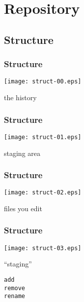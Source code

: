 \documentclass[english]{beamer}
\newcommand{\mysection}[2]{%
  \hypertarget{#2}{}%
  \section{#1}%
  \label{#2}%
}
\newcommand{\mysubsection}[2]{%
  \hypertarget{#2}{}%
  \subsection{#1}%
  \label{#2}%
}
\newcommand{\CMD}[1]{%
\texttt{\textcolor{code-green}{#1}}%
}
\begin{document}
\mysection{Repository}{_repository}
\mysubsection{Structure}{repo:structure}
\begin{frame}
\frametitle{Structure}

\texttt{[image: struct-00.eps]}
\vspace{\baselineskip}
\begin{center}
        the history
\end{center}
\vspace{\textheight}
\end{frame}

\begin{frame}
\frametitle{Structure}

\texttt{[image: struct-01.eps]}
\vspace{\baselineskip}
\begin{center}
        staging area
\end{center}
\vspace{\textheight}
\end{frame}

\begin{frame}
\frametitle{Structure}

\texttt{[image: struct-02.eps]}
\vspace{\baselineskip}
\begin{center}
        files you edit
\end{center}
\vspace{\textheight}
\end{frame}

\begin{frame}
\frametitle{Structure}

\texttt{[image: struct-03.eps]}
\vspace{\baselineskip}
\begin{center}
        ``staging''               

        \vspace{\baselineskip}
        \CMD{add} \\
        \CMD{remove} \\
        \CMD{rename}
\end{center}
\vspace{\textheight}
\end{frame}
\end{document}

